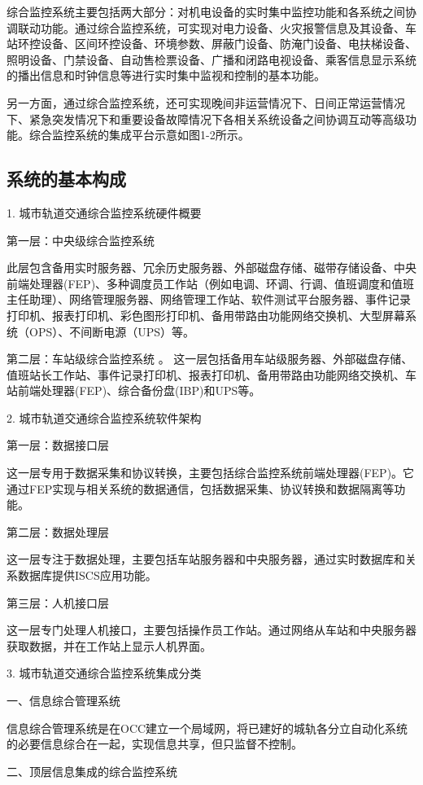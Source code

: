 综合监控系统主要包括两大部分：对机电设备的实时集中监控功能和各系统之间协调联动功能。通过综合监控系统，可实现对电力设备、火灾报警信息及其设备、车站环控设备、区间环控设备、环境参数、屏蔽门设备、防淹门设备、电扶梯设备、照明设备、门禁设备、自动售检票设备、广播和闭路电视设备、乘客信息显示系统的播出信息和时钟信息等进行实时集中监视和控制的基本功能。

另一方面，通过综合监控系统，还可实现晚间非运营情况下、日间正常运营情况下、紧急突发情况下和重要设备故障情况下各相关系统设备之间协调互动等高级功能。综合监控系统的集成平台示意如图1-2所示。

\subsection{系统的基本构成}
1. 城市轨道交通综合监控系统硬件概要

第一层：中央级综合监控系统

此层包含备用实时服务器、冗余历史服务器、外部磁盘存储、磁带存储设备、中央前端处理器(FEP)、多种调度员工作站（例如电调、环调、行调、值班调度和值班主任助理）、网络管理服务器、网络管理工作站、软件测试平台服务器、事件记录打印机、报表打印机、彩色图形打印机、备用带路由功能网络交换机、大型屏幕系统（OPS）、不间断电源（UPS）等。

第二层：车站级综合监控系统
。
这一层包括备用车站级服务器、外部磁盘存储、值班站长工作站、事件记录打印机、报表打印机、备用带路由功能网络交换机、车站前端处理器(FEP)、综合备份盘(IBP)和UPS等。

2. 城市轨道交通综合监控系统软件架构

第一层：数据接口层

这一层专用于数据采集和协议转换，主要包括综合监控系统前端处理器(FEP)。它通过FEP实现与相关系统的数据通信，包括数据采集、协议转换和数据隔离等功能。

第二层：数据处理层

这一层专注于数据处理，主要包括车站服务器和中央服务器，通过实时数据库和关系数据库提供ISCS应用功能。

第三层：人机接口层

这一层专门处理人机接口，主要包括操作员工作站。通过网络从车站和中央服务器获取数据，并在工作站上显示人机界面。

3. 城市轨道交通综合监控系统集成分类

一、信息综合管理系统

信息综合管理系统是在OCC建立一个局域网，将已建好的城轨各分立自动化系统的必要信息综合在一起，实现信息共享，但只监督不控制。

二、顶层信息集成的综合监控系统

